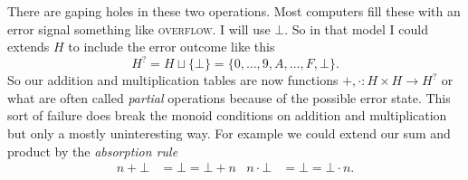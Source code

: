 \documentclass[12pt,twoside,letterpaper]{memoir}
\begin{document}
\begin{center}
\end{center}
There are gaping holes in these two operations.  Most computers fill 
these with an error signal something like \textsc{overflow}.  I will 
use $\bot$.  So in that model I could extends $H$ to include the 
error outcome like this
\[
    H^? = H\sqcup\{\bot\} = \{0,\ldots,9,A,\ldots, F,\bot\}.
\]
So our addition and multiplication tables are now functions 
$+,\cdot :H \times H\to H^?$ or what are often called \emph{partial}
operations because of the possible error state.  This sort of 
failure does break the monoid conditions on addition and multiplication 
but only a mostly uninteresting way.  For example we could extend our 
sum and product by the \emph{absorption rule}
\begin{align*}
    n+\bot & = \bot = \bot + n 
    & 
    n\cdot \bot & = \bot = \bot \cdot n.
\end{align*}  
\end{document}
